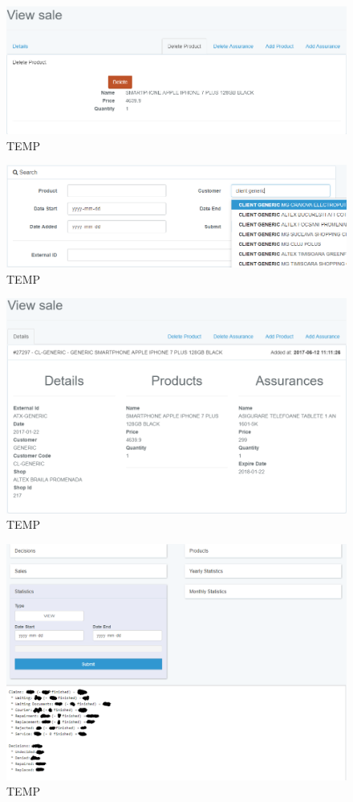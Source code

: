 	\begin{figure}
		\includegraphics[width=\linewidth]{../imagini/sales_delete_product.png}
		\caption{TEMP}
		\label{fig:TEMP}
	\end{figure}
	\begin{figure}
		\includegraphics[width=\linewidth]{../imagini/sales_search.png}
		\caption{TEMP}
		\label{fig:TEMP}
	\end{figure}
	\begin{figure}
		\includegraphics[width=\linewidth]{../imagini/sales_view.png}
		\caption{TEMP}
		\label{fig:TEMP}
	\end{figure}
	\begin{figure}
		\includegraphics[width=\linewidth]{../imagini/statistics.png}
		\caption{TEMP}
		\label{fig:TEMP}
	\end{figure}
